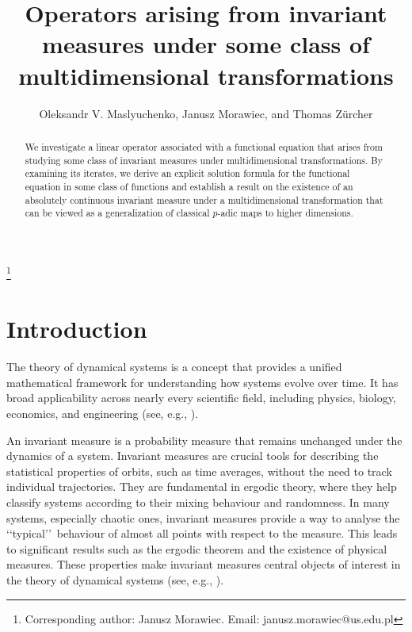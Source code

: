 \documentclass{amsart}
\theoremstyle{plain}%
\theoremstyle{definition}
\theoremstyle{remark}
\begin{document}
\title[Operators arising from invariant measures]{Operators arising from invariant measures under some class of multidimensional transformations}

\author{Oleksandr V. Maslyuchenko, Janusz Morawiec, 
and Thomas Zürcher
}
\address{Institute of Mathematics, University of Silesia, Bankowa 14, 40-007 Katowice, Poland}\thanks{Corresponding author: Janusz Morawiec. Email: janusz.morawiec@us.edu.pl}




\begin{abstract}
We investigate a linear operator associated with a functional equation that arises from studying some class of invariant measures under multidimensional transformations. By examining its iterates, we derive an explicit solution formula for the functional equation in some class of functions and establish a result on the existence of an absolutely continuous invariant measure under a multidimensional transformation that can be viewed as a generalization of classical $p$\nobreakdash-adic maps to higher dimensions.
\end{abstract}

\maketitle


\section{Introduction}\label{section1}

The theory of dynamical systems is a concept that provides a unified mathematical framework for understanding how systems evolve over time. It has broad applicability across nearly every scientific field, including physics, biology, economics, and engineering (see, e.g., \cite{RH12, N13, JR15, A18, K23, A24, W24}).

An invariant measure is a probability measure that remains unchanged under the dynamics of a system. Invariant measures are crucial tools for describing the statistical properties of orbits, such as time averages, without the need to track individual trajectories.
They are fundamental in ergodic theory, where they help classify systems according to their mixing behaviour and randomness. In many systems, especially chaotic ones, invariant measures provide a way to analyse the \lq\lq typical\rq\rq\ behaviour of almost all points with respect to the measure. This leads to significant results such as the ergodic theorem and the existence of physical measures. These properties make invariant measures central objects of interest in the theory of dynamical systems (see, e.g., \cite{LM94,Z96,C02,D03,Y08,C20}).
\end{document}
